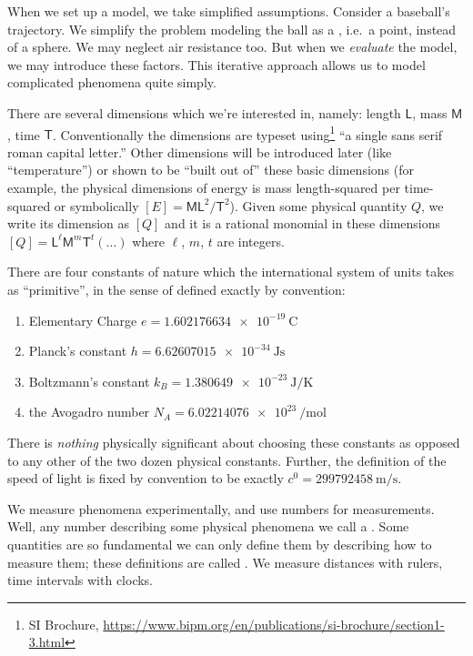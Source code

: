 When we set up a model, we take simplified assumptions. Consider
a baseball's trajectory. We simplify the problem modeling the
ball as a , i.e.~a point, instead of a
sphere. We may neglect air resistance too. But when we
\emph{evaluate} the model, we may introduce these factors. This
iterative approach allows us to model complicated phenomena quite
simply.

There are several dimensions which we're interested in, namely: length
$\mathsf{L}$, mass $\mathsf{M}$, time $\mathsf{T}$. Conventionally the
dimensions are typeset using\footnote{SI
Brochure, \url{https://www.bipm.org/en/publications/si-brochure/section1-3.html}}
``a single sans serif roman capital letter.'' Other dimensions will be
introduced later (like ``temperature'') or shown to be ``built out of''
these basic dimensions (for example, the physical dimensions of energy
is mass length-squared per time-squared or symbolically
$[E] = \mathsf{ML}^{2}/\mathsf{T}^{2}$).
Given
some physical quantity $Q$, we write its dimension as
$[Q]$ and it is a rational monomial in these dimensions
$[Q]=\mathsf{L}^{\ell}\mathsf{M}^{m}\mathsf{T}^{t}(\dots)$ where $\ell$,
$m$, $t$ are integers.

There are four constants of nature which the international system of
units takes as ``primitive'', in the sense of defined exactly by
convention:
\begin{enumerate}
    \item Elementary Charge $\si{\elementarycharge} = \SI{1.602176634e-19}{\coulomb}$
    \item Planck's constant $h = \SI{6.62607015e-34}{\joule\second}$
    \item Boltzmann's constant $k_{B}=\SI{1.380649e-23}{\joule\per\kelvin}$
    \item the Avogadro number $N_{A} = \SI{6.02214076e23}{\per\mole}$
\end{enumerate}
There is \emph{nothing} physically significant about choosing these
constants as opposed to any other of the two dozen physical constants.
Further, the definition of the speed of light is fixed by convention to
be exactly $\si{\clight} = \SI{299792458}{\meter\per\second}$.

\label{M:intro:standards-and-units}
We measure phenomena experimentally, and use numbers  for
measurements. Well, any number describing some physical phenomena
we call a . Some
quantities are so fundamental we can only define them by describing how
to measure them; these definitions are called .
We measure distances with rulers, time intervals with clocks.

